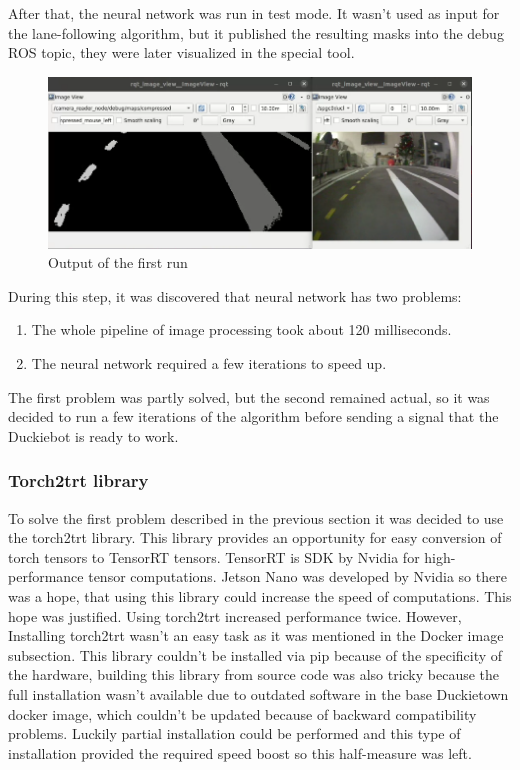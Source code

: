 After that, the neural network was run in test mode. It wasn't used as input for the lane-following algorithm, but it published the resulting masks into the debug 
ROS topic, they were later visualized in the special tool.
\begin{figure}[htbp]

        \includegraphics[scale=0.5]{src/Implementation/assets/first_run.png}
    \caption{Output of the first run}\label{fig:first_run}
\end{figure}
During this step, it was discovered that neural network has two problems:
\begin{enumerate}
    \item The whole pipeline of image processing took about 120 milliseconds.
    \item The neural network required a few iterations to speed up.
\end{enumerate}

The first problem was partly solved, but the second remained actual, so it was decided to run a few iterations of the algorithm before sending a signal that 
the Duckiebot is ready to work.

\subsubsection{Torch2trt library}
To solve the first problem described in the previous section it was decided to use the torch2trt library. This library provides an opportunity for easy conversion of  
torch tensors to TensorRT tensors. TensorRT is SDK by Nvidia for high-performance tensor computations. Jetson Nano was developed by Nvidia so there was a hope,
that using this library could increase the speed of computations. This hope was justified. Using torch2trt increased performance twice. However, Installing 
torch2trt wasn't an easy task as it was mentioned in the Docker image subsection. This library couldn't be installed via pip because of the specificity of the hardware, 
building this library from source code was also tricky because the full installation wasn't available due to outdated software in the base Duckietown docker image, 
which couldn't be updated because of backward compatibility problems. 
Luckily partial installation could be performed and this type of installation provided the required speed boost so this half-measure was left.
